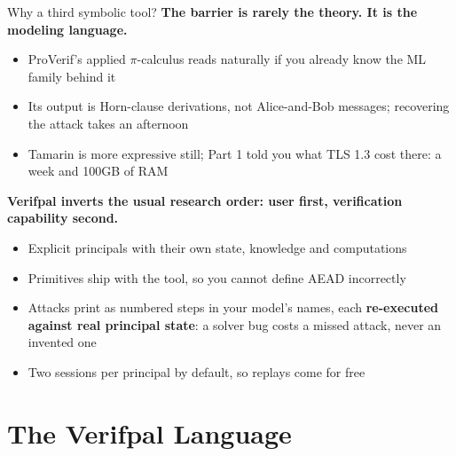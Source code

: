 \ifdefined\PRESENTATION\else\PassOptionsToClass{handout}{beamer}\fi\documentclass[aspectratio=169, lualatex]{beamer}
\begin{document}
\begin{frame}{Why a third symbolic tool?}
	\small
	\textbf{The barrier is rarely the theory. It is the modeling language.}
	\begin{itemize}
		\item ProVerif's applied $\pi$-calculus reads naturally if you already know the ML family behind it
		\item Its output is Horn-clause derivations, not Alice-and-Bob messages; recovering the attack takes an afternoon
		\item Tamarin is more expressive still; Part 1 told you what TLS 1.3 cost there: a week and 100GB of RAM
	\end{itemize}
	\vspace{0.3em}
	\textbf{Verifpal inverts the usual research order: user first, verification capability second.}
	\begin{itemize}
		\item Explicit principals with their own state, knowledge and computations
		\item Primitives ship with the tool, so you cannot define AEAD incorrectly
		\item Attacks print as numbered steps in your model's names, each \textbf{re-executed against real principal state}: a solver bug costs a missed attack, never an invented one
		\item Two sessions per principal by default, so replays come for free
	\end{itemize}
\end{frame}

\section{The Verifpal Language}
\end{document}
